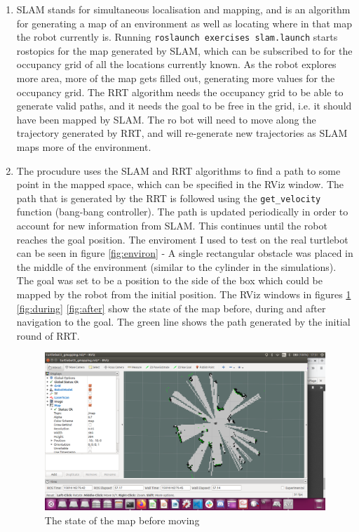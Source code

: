 \documentclass[12pt,a4paper]{article}
\begin{document}
\begin{enumerate}[label=(\alph*)]
	\item SLAM stands for simultaneous localisation and mapping, and is an algorithm for generating a map of an environment as well as locating where in that map the robot currently is. Running \texttt{roslaunch exercises slam.launch} starts rostopics for the map generated by SLAM, which can be subscribed to for the occupancy grid of all the locations currently known. As the robot explores more area, more of the map gets filled out, generating more values for the occupancy grid. The RRT algorithm needs the occupancy grid to be able to generate valid paths, and it needs the goal to be free in the grid, i.e. it should have been mapped by SLAM. The ro bot will need to move along the trajectory generated by RRT, and will re-generate new trajectories as SLAM maps more of the environment.
	\item The procudure uses the SLAM and RRT algorithms to find a path to some point in the mapped space, which can be specified in the RViz window. The path that is generated by the RRT is followed using the \texttt{get\_velocity} function (bang-bang controller). The path is updated periodically in order to account for new information from SLAM. This continues until the robot reaches the goal position. The enviroment I used to test on the real turtlebot can be seen in figure \ref{fig:environ} - A single rectangular obstacle was placed in the middle of the environment (similar to the cylinder in the simulations). The goal was set to be a position to the side of the box which could be mapped by the robot from the initial position. The RViz windows in figures \ref{fig:before} \ref{fig:during} \ref{fig:after} show the state of the map before, during and after navigation to the goal. The green line shows the path generated by the initial round of RRT.
	\begin{figure}[!htb]
		\centering
		\includegraphics[width=\textwidth]{fig/4e-before.png}
		\caption{The state of the map before moving}
		\label{fig:before}
	\end{figure}


\end{enumerate}
\end{document}
